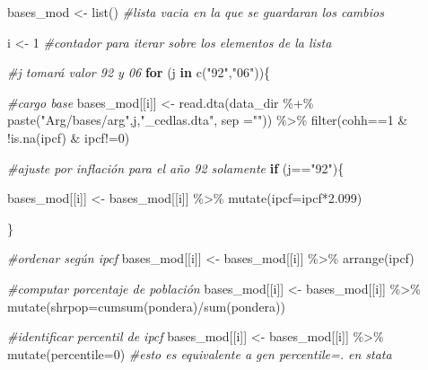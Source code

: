 \documentclass[
]{book}
\newenvironment{Shaded}{\begin{snugshade}}{\end{snugshade}}
\newcommand{\AttributeTok}[1]{\textcolor[rgb]{0.77,0.63,0.00}{#1}}
\newcommand{\CommentTok}[1]{\textcolor[rgb]{0.56,0.35,0.01}{\textit{#1}}}
\newcommand{\ControlFlowTok}[1]{\textcolor[rgb]{0.13,0.29,0.53}{\textbf{#1}}}
\newcommand{\DecValTok}[1]{\textcolor[rgb]{0.00,0.00,0.81}{#1}}
\newcommand{\FloatTok}[1]{\textcolor[rgb]{0.00,0.00,0.81}{#1}}
\newcommand{\FunctionTok}[1]{\textcolor[rgb]{0.00,0.00,0.00}{#1}}
\newcommand{\NormalTok}[1]{#1}
\newcommand{\OtherTok}[1]{\textcolor[rgb]{0.56,0.35,0.01}{#1}}
\newcommand{\SpecialCharTok}[1]{\textcolor[rgb]{0.00,0.00,0.00}{#1}}
\newcommand{\StringTok}[1]{\textcolor[rgb]{0.31,0.60,0.02}{#1}}
\begin{document}
\begin{Shaded}
\begin{Highlighting}[]
\NormalTok{bases\_mod }\OtherTok{\textless{}{-}} \FunctionTok{list}\NormalTok{() }\CommentTok{\#lista vacia en la que se guardaran los cambios}

\NormalTok{i }\OtherTok{\textless{}{-}} \DecValTok{1}              \CommentTok{\#contador para iterar sobre los elementos de la lista}

\CommentTok{\#j tomará valor 92 y 06}
\ControlFlowTok{for}\NormalTok{ (j }\ControlFlowTok{in} \FunctionTok{c}\NormalTok{(}\StringTok{"92"}\NormalTok{,}\StringTok{"06"}\NormalTok{))\{     }
  
  \CommentTok{\#cargo base}
\NormalTok{  bases\_mod[[i]] }\OtherTok{\textless{}{-}} \FunctionTok{read.dta}\NormalTok{(data\_dir }\SpecialCharTok{\%+\%} \FunctionTok{paste}\NormalTok{(}\StringTok{"Arg/bases/arg"}\NormalTok{,j,}\StringTok{"\_cedlas.dta"}\NormalTok{, }\AttributeTok{sep =}\StringTok{""}\NormalTok{)) }\SpecialCharTok{\%\textgreater{}\%} 
                    \FunctionTok{filter}\NormalTok{(cohh}\SpecialCharTok{==}\DecValTok{1} \SpecialCharTok{\&} \SpecialCharTok{!}\FunctionTok{is.na}\NormalTok{(ipcf) }\SpecialCharTok{\&}\NormalTok{ ipcf}\SpecialCharTok{!=}\DecValTok{0}\NormalTok{)}
  
  \CommentTok{\#ajuste por inflación para el año 92 solamente}
  \ControlFlowTok{if}\NormalTok{ (j}\SpecialCharTok{==}\StringTok{"92"}\NormalTok{)\{}
    
\NormalTok{      bases\_mod[[i]] }\OtherTok{\textless{}{-}}\NormalTok{ bases\_mod[[i]] }\SpecialCharTok{\%\textgreater{}\%} \FunctionTok{mutate}\NormalTok{(}\AttributeTok{ipcf=}\NormalTok{ipcf}\SpecialCharTok{*}\FloatTok{2.099}\NormalTok{)}
    
\NormalTok{  \}}
  
  \CommentTok{\#ordenar según ipcf}
\NormalTok{  bases\_mod[[i]] }\OtherTok{\textless{}{-}}\NormalTok{ bases\_mod[[i]] }\SpecialCharTok{\%\textgreater{}\%} \FunctionTok{arrange}\NormalTok{(ipcf)}
  
  \CommentTok{\#computar porcentaje de población}
\NormalTok{  bases\_mod[[i]] }\OtherTok{\textless{}{-}}\NormalTok{ bases\_mod[[i]] }\SpecialCharTok{\%\textgreater{}\%} \FunctionTok{mutate}\NormalTok{(}\AttributeTok{shrpop=}\FunctionTok{cumsum}\NormalTok{(pondera)}\SpecialCharTok{/}\FunctionTok{sum}\NormalTok{(pondera))}
  
  \CommentTok{\#identificar percentil de ipcf}
\NormalTok{  bases\_mod[[i]] }\OtherTok{\textless{}{-}}\NormalTok{ bases\_mod[[i]] }\SpecialCharTok{\%\textgreater{}\%} \FunctionTok{mutate}\NormalTok{(}\AttributeTok{percentile=}\DecValTok{0}\NormalTok{)  }\CommentTok{\#esto es equivalente a gen percentile=. en stata}
   

\end{Highlighting}
\end{Shaded}
\end{document}
